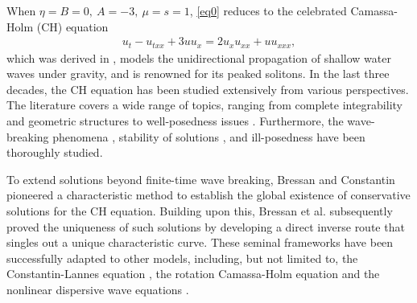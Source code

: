 \documentclass[10pt]{article}
\numberwithin{equation}{section}
\begin{document}
	When $\eta=B=0,\ A=-3,\ \mu=s=1$, \eqref{eq0} reduces to the celebrated Camassa-Holm (CH) equation
	\begin{align}\label{CH}
		u_t-u_{txx}+3uu_x=2u_xu_{xx}+uu_{xxx},
	\end{align}
	which was derived in \cite{camassa1993integrable,fuchssteiner1981symplectic}, models the unidirectional propagation of shallow water waves under gravity, and is renowned for its peaked solitons. In the last three decades, the CH equation has been studied extensively from various perspectives. The literature covers a wide range of topics, ranging from complete integrability \cite{fisher1999camassa, fuchssteiner1981symplectic} and geometric structures \cite{kouranbaeva1999camassa, misiolek1998shallow,MR2216268} to well-posedness issues \cite{danchin2001few,danchin2003note,li2000well}. Furthermore, the wave-breaking phenomena \cite{constantin2000existence,constantin1998global,constantin1998wave,constantin2000blow,MR4851884}, stability of solutions \cite{constantin2000stability,constantin2002stability}, and ill-posedness \cite{GuoYe2022ill,GuoLiu2019ill,li2025ill} have been thoroughly studied.
	
	
	To extend solutions beyond finite-time wave breaking, Bressan and Constantin \cite{Constantin2007conservative} pioneered a characteristic method to establish the global existence of conservative solutions for the CH equation. Building upon this, Bressan et al. \cite{bressan2014uniqueness} subsequently proved the uniqueness of such solutions by developing a direct inverse route that singles out a unique characteristic curve. These seminal frameworks have been successfully adapted to other models, including, but not limited to, the Constantin-Lannes equation \cite{MR2481064,MR3147227,MR4643656}, the rotation Camassa-Holm equation\cite{MR3936045,MR3912736} and the nonlinear dispersive wave equations \cite{MR2292515,MR4697983,MR4888793}.
	
\end{document}

